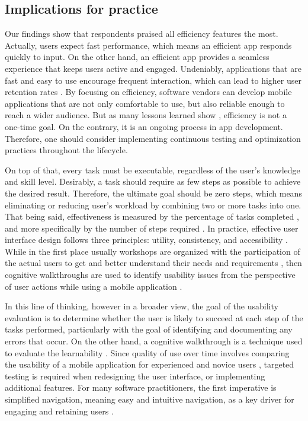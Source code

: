 \documentclass[preprint,12pt]{elsarticle}
\begin{document}
\subsection{Implications for practice}
Our findings show that respondents praised all efficiency features the most. Actually, users expect fast performance, which means an efficient app responds quickly to input. On the other hand, an efficient app provides a seamless experience that keeps users active and engaged. Undeniably, applications that are fast and easy to use encourage frequent interaction, which can lead to higher user retention rates \cite{zuniga2019tortoise}. By focusing on efficiency, software vendors can develop mobile applications that are not only comfortable to use, but also reliable enough to reach a wider audience. But as many lessons learned show \cite{leitner2007usability, redlarski2016hard, inupakutika2022performance}, efficiency is not a one-time goal. On the contrary, it is an ongoing process in app development. Therefore, one should consider implementing continuous testing and optimization practices throughout the lifecycle.

On top of that, every task must be executable, regardless of the user's knowledge and skill level. Desirably, a task should require as few steps as possible to achieve the desired result. Therefore, the ultimate goal should be zero steps, which means eliminating or reducing user's workload by combining two or more tasks into one. That being said, effectiveness is measured by the percentage of tasks completed \cite{ferreira2022impact}, and more specifically by the number of steps required \cite{weichbroth2020usability}. In practice, effective user interface design follows three principles: utility, consistency, and accessibility \cite{UX-principles2023}. While in the first place usually workshops are organized with the participation of the actual users to get and better understand their needs and requirements \cite{canbazoglu2016developing}, then cognitive walkthroughs are used to identify usability issues from the perspective of user actions while using a mobile application \cite{jadhav2013usability}.

In this line of thinking, however in a broader view, the goal of the usability evaluation is to determine whether the user is likely to succeed at each step of the tasks performed, particularly with the goal of identifying and documenting any errors that occur. On the other hand, a cognitive walkthrough is a technique used to evaluate the learnability \cite{Salazar2022}. Since quality of use over time involves comparing the usability of a mobile application for experienced and novice users \cite{marrella2018measuring}, targeted testing is required when redesigning the user interface, or implementing additional features. For many software practitioners, the first imperative is simplified navigation, meaning easy and intuitive navigation, as a key driver for engaging and retaining users \cite{Shweta2024}.
\end{document}
